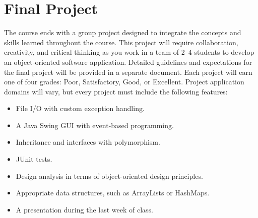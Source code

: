 \section*{Final Project}
The course ends with a group project designed to 
integrate the concepts and skills learned throughout the course. 
This project will require collaboration, creativity, and critical thinking 
as you work in a team of 2--4 students to develop 
an object-oriented software application. 
Detailed guidelines and expectations for the final project 
will be provided in a separate document.  
Each project will earn one of four grades:   
Poor, Satisfactory, Good, or Excellent. 
Project application domains will vary, 
but every project must include the following features:
\begin{itemize}[noitemsep,nolistsep]
\item File I/O with custom exception handling. 
\item A Java Swing GUI with event-based programming. 
\item Inheritance and interfaces with polymorphism. 
\item JUnit tests. 
\item Design analysis in terms of object-oriented design principles. 
\item Appropriate data structures, such as ArrayLists or HashMaps. 
\item A presentation during the last week of class. 
\end{itemize}

